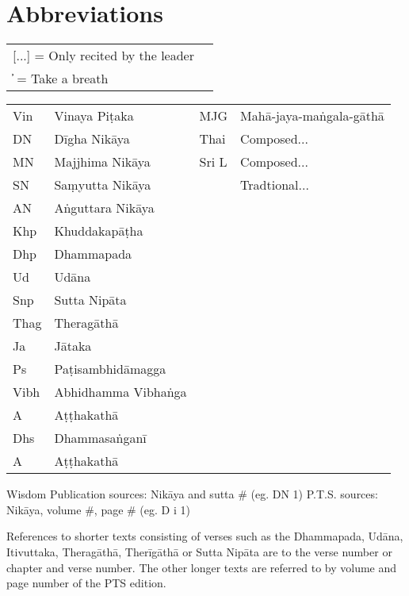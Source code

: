 \chapter{Abbreviations}

\thispagestyle{empty}

{}
\bigskip

{\raggedright
  \fontsize{10}{14}\selectfont

  \begin{tabular}{@{}ll@{}}
   [...] = Only recited by the leader \\
    ̓     = Take a breath               \\
  \end{tabular}

  \begin{tabular}{@{}llll@{}}
    Vin  & Vinaya Piṭaka       & MJG   & Mahā-jaya-maṅgala-gāthā \\
    DN   & Dīgha Nikāya        & Thai  & Composed...             \\
    MN   & Majjhima Nikāya     & Sri L & Composed...             \\
    SN   & Saṃyutta Nikāya     &       & Tradtional...           \\
    AN   & Aṅguttara Nikāya    &       &                          \\
    Khp  & Khuddakapāṭha       &       &                 \\
    Dhp  & Dhammapada          &       &                 \\
    Ud   & Udāna               &       &                 \\
    Snp  & Sutta Nipāta        &       &                 \\
    Thag & Theragāthā          &       &                 \\
    Ja   & Jātaka              &       &                 \\
    Ps   & Paṭisambhidāmagga   &       &                 \\
    Vibh & Abhidhamma Vibhaṅga &       &                 \\
    A    & Aṭṭhakathā          &       &                 \\
    Dhs  & Dhammasaṅganī       &       &                 \\
    A    & Aṭṭhakathā          &       &                 \\

  \end{tabular}

  \bigskip

  Wisdom Publication sources: Nikāya and sutta # (eg. DN 1)
  P.T.S. sources: Nikāya, volume #, page # (eg. D i 1)

  References to shorter texts consisting of verses such as the Dhammapada, Udāna,
  Itivuttaka, Theragāthā, Therīgāthā or Sutta Nipāta are to the verse number or
  chapter and verse number. The other longer texts are referred to by volume and
  page number of the PTS edition.

}
